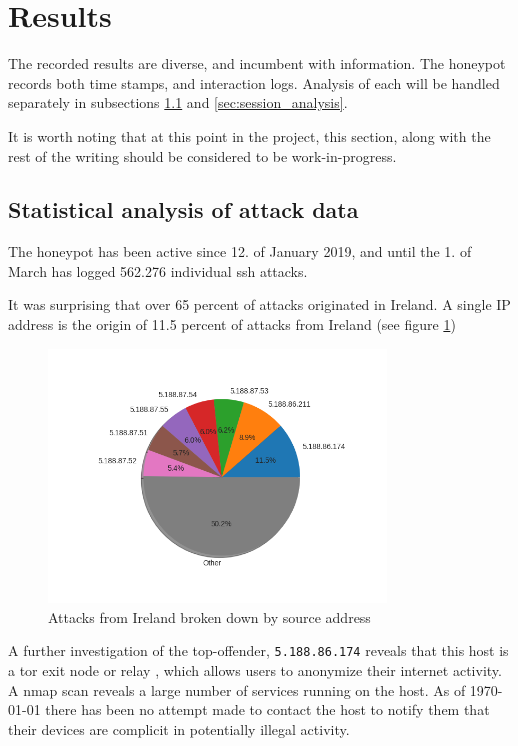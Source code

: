 \section{Results}
\label{sec:results}

The recorded results are diverse, and incumbent with 
information. The honeypot records both time stamps, and 
interaction logs. Analysis of each will be handled separately 
in subsections \ref{sec:time_analysis} and 
\ref{sec:session_analysis}. 

It is worth noting that at this point in the project,
this section, along with the rest of the writing should
be considered to be work-in-progress.

\subsection{Statistical analysis of attack data}
\label{sec:time_analysis}

    The honeypot has been active since 12. of January
    2019, and until the 1. of March has logged 
    562.276 individual ssh attacks. 

    It was surprising that over 65 percent of attacks 
    originated in Ireland. A single IP address is the
    origin of 11.5 percent of attacks from Ireland 
    (see figure \ref{fig:ireland_breakdown})
    
    \begin{figure}
        \includegraphics[width=0.8\textwidth]{src/images/ireland_breakdown.png}
        \caption{Attacks from Ireland broken down by source address}
        \label{fig:ireland_breakdown}
    \end{figure}

    A further investigation of the top-offender, 
    \texttt{5.188.86.174} reveals that this host
    is a tor exit node or relay \cite{tor}, which allows users
    to anonymize their internet activity. A nmap scan reveals
    a large number of services running on the host. As of \today
    there has been no attempt made to contact the host to notify
    them that their devices are complicit in potentially 
    illegal activity.


